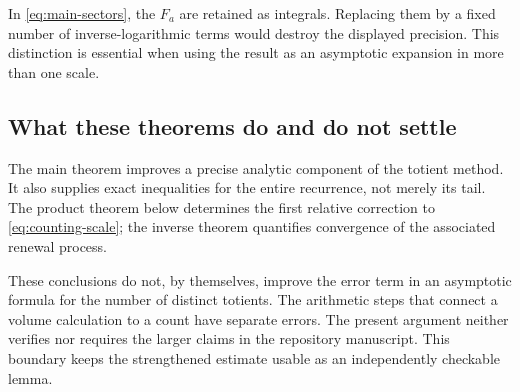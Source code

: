 In \eqref{eq:main-sectors}, the $F_a$ are retained as integrals.
Replacing them by a fixed number of inverse-logarithmic terms would
destroy the displayed precision. This distinction is essential when
using the result as an asymptotic expansion in more than one scale.

\subsection{What these theorems do and do not settle}

The main theorem improves a precise analytic component of the totient
method. It also supplies exact inequalities for the entire recurrence,
not merely its tail. The product theorem below determines the first
relative correction to \eqref{eq:counting-scale}; the inverse theorem
quantifies convergence of the associated renewal process.

These conclusions do not, by themselves, improve the error term in an
asymptotic formula for the number of distinct totients. The arithmetic
steps that connect a volume calculation to a count have separate errors.
The present argument neither verifies nor requires the larger claims
in the repository manuscript. This boundary keeps the strengthened
estimate usable as an independently checkable lemma.
